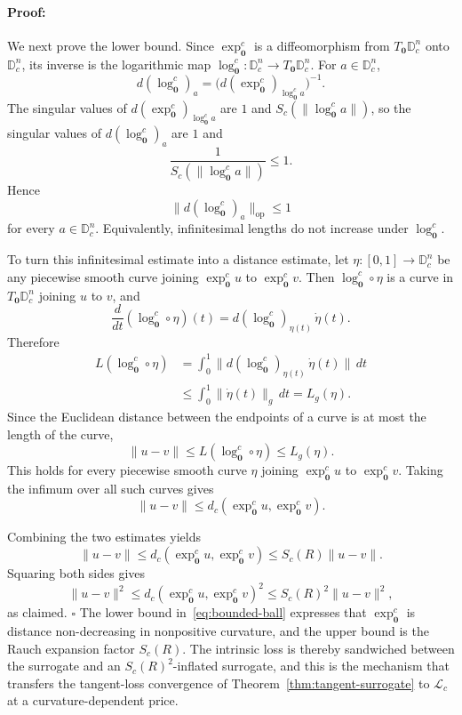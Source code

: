 \documentclass[letterpaper]{article}
\newenvironment{proof}[1][Proof]{\paragraph{#1:}}{\hfill$\square$}
\newcommand{\D}{\mathbb{D}}      %
\newcommand{\exps}{\exp_{\mathbf{0}}^c}
\newcommand{\logs}{\log_{\mathbf{0}}^c}
\begin{document}
\begin{proof}
We next prove the lower bound. Since $\exps$ is a diffeomorphism from
$T_{\mathbf 0}\D_c^n$ onto $\D_c^n$, its inverse is the logarithmic map
$\logs:\D_c^n\to T_{\mathbf 0}\D_c^n$. For $a\in\D_c^n$,
\[
d(\logs)_a
=
\bigl(d(\exps)_{\logs a}\bigr)^{-1}.
\]
The singular values of $d(\exps)_{\logs a}$ are $1$ and
$S_c(\|\logs a\|)$, so the singular values of $d(\logs)_a$ are
$1$ and
\[
\frac{1}{S_c(\|\logs a\|)}\le 1.
\]
Hence
\[
\|d(\logs)_a\|_{\mathrm{op}}\le 1
\]
for every $a\in\D_c^n$. Equivalently, infinitesimal lengths do not increase
under $\logs$.

To turn this infinitesimal estimate into a distance estimate, let
$\eta:[0,1]\to\D_c^n$ be any piecewise smooth curve joining
$\exps u$ to $\exps v$. Then $\logs\circ\eta$ is a curve in
$T_{\mathbf 0}\D_c^n$ joining $u$ to $v$, and
\[
\frac{d}{dt}(\logs\circ\eta)(t)
=
d(\logs)_{\eta(t)}\,\dot\eta(t).
\]
Therefore
\[
\begin{aligned}
L(\logs\circ\eta)
&=
\int_0^1
\big\|d(\logs)_{\eta(t)}\,\dot\eta(t)\big\|\,dt \\
&\le
\int_0^1
\|\dot\eta(t)\|_g\,dt
=
L_g(\eta).
\end{aligned}
\]
Since the Euclidean distance between the endpoints of a curve is at most the
length of the curve,
\[
\|u-v\|
\le
L(\logs\circ\eta)
\le
L_g(\eta).
\]
This holds for every piecewise smooth curve $\eta$ joining $\exps u$ to
$\exps v$. Taking the infimum over all such curves gives
\[
\|u-v\|
\le
d_c(\exps u,\exps v).
\]

Combining the two estimates yields
\[
\|u-v\|
\le
d_c(\exps u,\exps v)
\le
S_c(R)\|u-v\|.
\]
Squaring both sides gives
\[
\|u-v\|^2
\le
d_c(\exps u,\exps v)^2
\le
S_c(R)^2\|u-v\|^2,
\]
as claimed.
\end{proof}
The lower bound in~\eqref{eq:bounded-ball} expresses that $\exps$ is distance
non-decreasing in nonpositive curvature, and the upper bound is the Rauch
expansion factor $S_c(R)$. The intrinsic loss is thereby sandwiched between
the surrogate and an $S_c(R)^2$-inflated surrogate, and this is the mechanism
that transfers the tangent-loss convergence of
Theorem~\ref{thm:tangent-surrogate} to $\mathcal L_c$ at a curvature-dependent
price.
\end{document}
